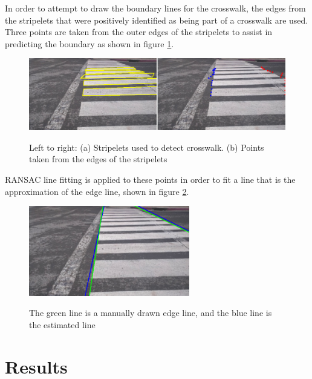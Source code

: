 \documentclass[12pt]{ucthesis}
\newcommand{\captionfonts}{\small\bf\ssp}
\begin{document}
In order to attempt to draw the boundary lines for the crosswalk, the edges from the stripelets that were positively identified as being part of a crosswalk are used. Three points are taken from the outer edges of the stripelets to assist in predicting the boundary as shown in figure \ref{fig:LinesAndEdgePoints}.  

\begin{figure}[t]
\begin{center}
\includegraphics[width=14cm]{LinesAndEdgePoints.png}
\captionfonts
\caption[Crosswalk Detected Stripelets and points along their edges]{Left to right: (a) Stripelets used to detect crosswalk. (b) Points taken from the edges of the stripelets}
\label{fig:LinesAndEdgePoints}
\end{center}
\end{figure}

RANSAC line fitting is applied to these points in order to fit a line that is the approximation of the edge line, shown in figure \ref{fig:LinesUsingJustGoodStartAndEnds}. 

\begin{figure}[t]
\begin{center}
\includegraphics[width=7cm]{LinesUsingJustGoodStartAndEnds.png}
\captionfonts
\caption[Manually Entered and Estimated Line]{The green line is a manually drawn edge line, and the blue line is the estimated line}
\label{fig:LinesUsingJustGoodStartAndEnds}
\end{center}
\end{figure}


\chapter{Results}
\label{results}
\end{document}
